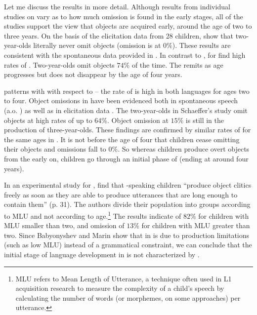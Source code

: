 \documentclass[output=paper,modfonts,newtxmath,hidelinks,]{langscibook}
\begin{document}
Let me discuss the results in more detail. Although results from individual studies on  vary as to how much omission is found in the early stages, all of the studies support the view that  objects are acquired early, around the age of two to three years. On the basis of the elicitation data from 28 children, \citet{Wexler-etal2004} show that two-year-olds literally never omit objects (omission is at $0\%$). These results are consistent with the spontaneous data provided in \citet{Stiasny2006}. In contrast to , for  \citet{Wexler-etal2004} find high rates of . Two-year-olds omit objects $74\%$ of the time. The  remits as age progresses but does not disappear by the age of four years.

 patterns with  with respect to  -- the rate of  is high in both languages for ages two to four. Object omissions in  have been evidenced both in spontaneous speech (a.o. \citealt{Guasti1993}) as well as in elicitation data \citep{Schaeffer2000}. The two-year-olds in Schaeffer’s study omit objects at high rates of up to $64\%$. Object omission at $15\%$ is still  in the production of three-year-olds. These findings are confirmed by similar rates of  for the same ages in \citet{Tedeschi2009}. It is not before the age of four that  children cease omitting their objects and omissions fall to $0\%$. So whereas  children produce overt objects from the early on,  children go through an initial phase of  (ending at around four years).

In an experimental study for , \citet{Babyonyshev-Marin2006} find that -speaking children “produce object clitics freely as soon as they are able to produce utterances that are long enough to contain them” (p. 31). The authors divide their population into groups according to MLU and not according to age.\footnote{\label{17:fn4}MLU refers to Mean Length of Utterance, a technique often used in L1 acquisition research to measure the complexity of a child’s speech by calculating the number of words (or morphemes, on some approaches) per utterance.} The results indicate  of $82\%$ for children with MLU smaller than two, and omission of $13\%$ for children with MLU greater than two. Since Babyonyshev and Marin show that  in  is due to production limitations (such as low MLU) instead of a grammatical constraint, we can conclude that the initial stage of language development in  is not characterized by .
\end{document}
